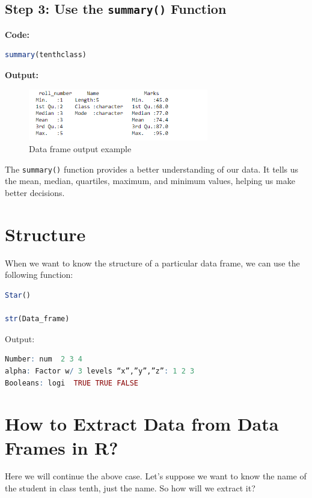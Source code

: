 \documentclass[10pt]{book}
\begin{document}
\subsection{Step 3: Use the \texttt{summary()} Function}

\textbf{Code:}
\begin{lstlisting}[language=R]
summary(tenthclass)
\end{lstlisting}

\textbf{Output:}
\begin{figure}[h]
    \begin{flushleft}
        \includegraphics[width=0.7\textwidth]{Data-Frames-in-R-1-3.png} %
        \caption{Data frame output example}
        \label{fig:dataframe}
    \end{flushleft}
\end{figure}

The \texttt{summary()} function provides a better understanding of our data. It tells us the mean, median, quartiles, maximum, and minimum values, helping us make better decisions.



\section*{Structure}
When we want to know the structure of a particular data frame, we can use the following function:

\begin{lstlisting}[language=R]
Star()

str(Data_frame)
\end{lstlisting}

\noindent Output:

\begin{lstlisting}[language=R]
Number: num  2 3 4
alpha: Factor w/ 3 levels “x”,”y”,”z”: 1 2 3
Booleans: logi  TRUE TRUE FALSE
\end{lstlisting}


\section*{How to Extract Data from Data Frames in R?}
Here we will continue the above case. Let’s suppose we want to know the name of the student in class tenth, just the name. So how will we extract it?
\end{document}

